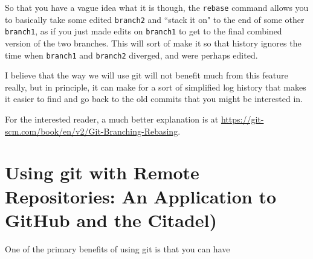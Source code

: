 \documentclass[11pt]{article}
\begin{document}
So that you have a vague idea what it is though, the \texttt{rebase} command allows you to basically take some edited \texttt{branch2} and ``stack it on" to the end of some other \texttt{branch1}, as if you just made edits on \texttt{branch1} to get to the final combined version of the two branches.  This will sort of make it so that history ignores the time when \texttt{branch1} and \texttt{branch2} diverged, and were perhaps edited.  

I believe that the way we will use git will not benefit much from this feature really, but in principle, it can make for a sort of simplified log history that makes it easier to find and go back to the old commits that you might be interested in.

For the interested reader, a much better explanation is at \url{https://git-scm.com/book/en/v2/Git-Branching-Rebasing}.

\section{Using git with Remote Repositories: An Application to GitHub and the Citadel)}

One of the primary benefits of using git is that you can have 
\end{document}
